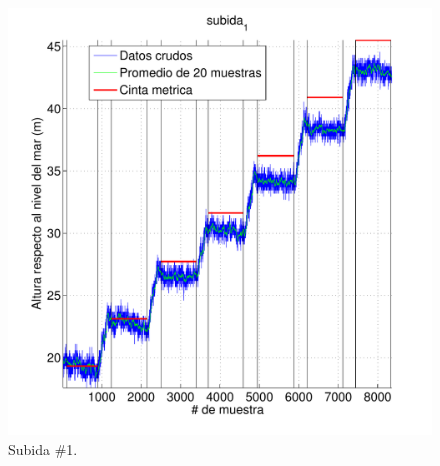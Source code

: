 \documentclass[spanish,12pt,a4paper,titlepage]{report}
\begin{document}
\vspace{-14pt}
\begin{figure}[h!]
\centering
  \includegraphics[width=.95\textwidth]{./pics/metros-s1.pdf}
\vspace{-15pt}
  \caption{Subida \#1.}
  \label{fig:metros-s1.pdf}
\end{figure}
\vspace{-40pt}
\end{document}
